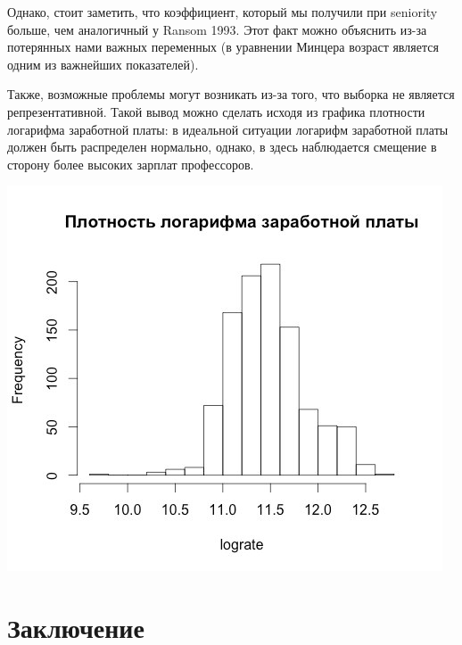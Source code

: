 \documentclass[a4paper, 12pt]{article}
\theoremstyle{definition}
\theoremstyle{plain}
\begin{document}
Однако, стоит заметить, что коэффициент, который мы получили при seniority больше, чем аналогичный у Ransom 1993. Этот факт можно объяснить из-за потерянных нами важных переменных (в уравнении Минцера возраст является одним из важнейших показателей).

Также, возможные проблемы могут возникать из-за того, что выборка не является репрезентативной. Такой вывод можно сделать исходя из графика плотности логарифма заработной платы: в идеальной ситуации логарифм заработной платы должен быть распределен нормально, однако, в здесь наблюдается смещение в сторону более высоких зарплат профессоров.


\begin{center}
\includegraphics[scale=0.5]{image1}
\end{center}

\section{Заключение}

\renewcommand{\refname}{Список литературы}

 
\end{document}
